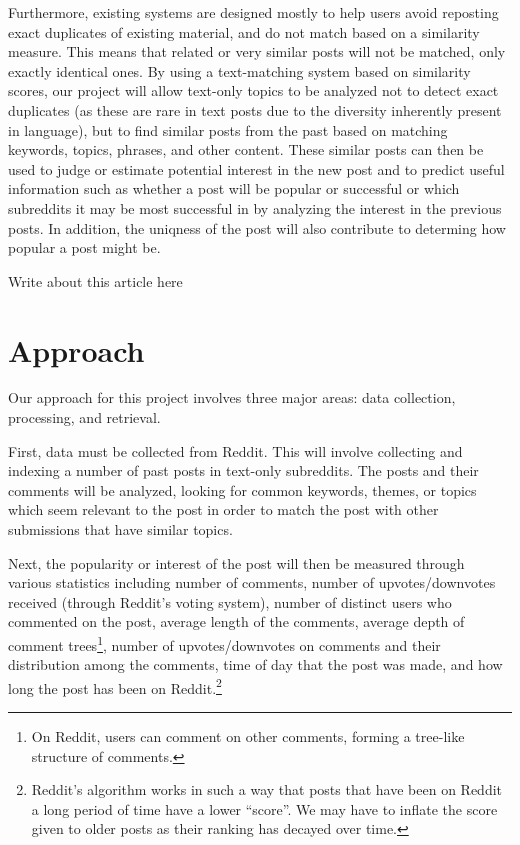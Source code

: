 \documentclass{acm_proc_article-sp}
\begin{document}
Furthermore, existing systems are designed mostly to help users avoid reposting exact duplicates of
existing material, and do not match based on a similarity measure.  This means that related or
very similar posts will not be matched, only exactly identical ones.  By using a text-matching system based
on similarity scores,
our project will allow text-only topics to be analyzed not to detect exact duplicates (as these
are rare in text posts due to the diversity inherently present in language), but to find similar
posts from the past based on matching keywords, topics, phrases, and other
content.  These similar posts can then be used to judge or estimate potential interest in the new
post and to predict useful information such as whether a post will be popular or successful or
which subreddits it may be most successful in by analyzing the interest in the previous posts. 
In addition, the uniqness of the post will also contribute to determing how popular a post might be.

Write about this article here \cite{liu:interest}

\vspace{10 mm}

\section{Approach}
Our approach for this project involves three major areas: data collection, processing, and retrieval.

First, data must be collected from Reddit.  This will involve collecting and indexing a number of past posts
in text-only subreddits.  The posts and their comments will be analyzed, looking for common keywords,
themes, or topics which seem relevant to the post in order to match the post with other submissions
that have similar topics.

Next, the popularity or interest of the post will then be measured through various statistics including
number of comments, number of upvotes/downvotes received (through Reddit's voting system), number
of distinct users who commented on the post, average length of the comments, average depth of
comment trees\footnote{On Reddit, users can comment on other comments, forming a tree-like structure of comments.},
number of upvotes/downvotes on comments and their distribution among the comments, time of day that the post was made,
and how long the post has been on Reddit.\footnote{Reddit's algorithm works in such a way that posts that have been on Reddit
a long period of time have a lower ``score''. We may have to inflate the score given to older posts as their ranking
has decayed over time.}
\end{document}
